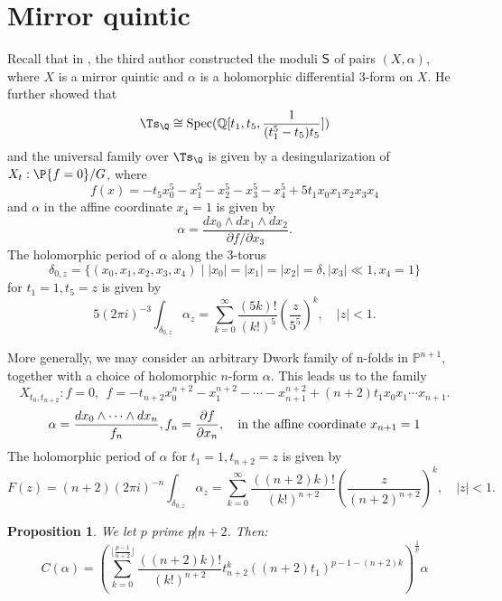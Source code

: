 \documentclass[11pt,leqno]{article}
\newtheorem{prop}{Proposition}
\theoremstyle{remark}
\theoremstyle{definition}
\begin{document}
\section{Mirror quintic}
Recall that in \cite[Section 3]{GMCD-MQCY3}, the third author constructed the moduli $\sf S$ of pairs $(X, \alpha)$, where $X$ is a mirror quintic and $\alpha$ is a holomorphic differential 3-form on $X$. He further showed that
\[
\Ts_\Q \cong \mathrm{Spec}(\mathbb{Q}[t_1, t_5, \frac{1}{(t_1^5-t_5)t_5}])
\]
and the universal family over $\Ts_\Q$ is given by a desingularization of $X_t: \P\{f=0\}/G$, where
\[
f(x) = -t_5x_0^5 - x_1^5 - x_2^5 - x_3^5 - x_4^5+5t_1x_0x_1x_2x_3x_4
\]
and $\alpha$ in the affine coordinate $x_4=1$ is given by
\[
\alpha= \frac{dx_0 \wedge dx_1 \wedge dx_2} 
{\partial f/\partial x_3}.
\]
The holomorphic period of $\alpha$ along the 3-torus \[\delta_{0,z} = \{(x_0, x_1, x_2, x_3, x_4) \mid |x_0| = |x_1| = |x_2| = \delta, |x_3| \ll 1, x_4=1\}\] for $t_1=1, t_5=z$ 
is given by
$$
5 (2\pi i)^{-3} \int_{\delta_{0,z}} \alpha_z = \sum^{\infty}_{k=0} \frac{(5k)!}{(k!)^5} (\frac{z}{5^5})^k, \quad |z|<1.
$$

More generally, we may consider an arbitrary Dwork family of n-folds in $\mathbb{P}^{n+1}$, together with a choice of holomorphic $n$-form $\alpha$.\cite{GMCD-DF} This leads us to the family 
\[
X_{t_0,t_{n+2}}:f=0,\ \  
f=-t_{n+2}x_0^{n+2} - x_{1}^{n+2}  - \cdots - x_{n+1}^{n+2} + (n+2)t_1x_0x_1\cdots x_{n+1}.
\] 
\[ 
\alpha= \frac{dx_0 \wedge \cdots \wedge dx_{n}}{f_{n}}, f_{n} = \frac{\partial f}{\partial x_{n}},\  \ \hbox{ in the affine coordinate } x_{n+1}=1
\]
The holomorphic period of $\alpha$ for $t_1=1, t_{n+2}=z$  is given by
$$
F(z) = (n+2) (2\pi i)^{-n} \int_{\delta_{0,z}} \alpha_z = \sum^{\infty}_{k=0} \frac{((n+2)k)!}{(k!)^{n+2}} (\frac{z}{(n+2)^{n+2}})^k, \quad |z|<1.
$$





\begin{prop} We let $p$ prime  $p\not|n+2$. Then:
\begin{equation}
C(\alpha) = \left( \sum_{k=0}^{\lfloor \frac{p-1}{n+2} \rfloor} \frac{((n+2)k)!}{(k!)^{n+2}}
t_{n+2}^k ((n+2)t_1)^{p-1-(n+2)k} \right)^{\frac{1}{p}} \alpha
\end{equation}
\end{prop}
\end{document}
